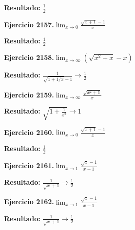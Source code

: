 \documentclass[10pt,a4paper]{article}
\begin{document}
\begin{solbox}
\textbf{Resultado:} \(\displaystyle \frac{1}{2}\)
\end{solbox}

\begin{ejbox}
\textbf{Ejercicio 2157.}\quad $\lim_{x\to 0} \frac{\sqrt{x+1}-1}{x}$
\end{ejbox}

\begin{solbox}
\textbf{Resultado:} \(\displaystyle \frac{1}{2}\)
\end{solbox}

\begin{ejbox}
\textbf{Ejercicio 2158.}\quad $\lim_{x\to \infty} (\sqrt{x^2+x} - x)$
\end{ejbox}

\begin{solbox}
\textbf{Resultado:} \(\displaystyle \frac{1}{\sqrt{1+1/x}+1} \to \frac{1}{2}\)
\end{solbox}

\newpage
\begin{ejbox}
\textbf{Ejercicio 2159.}\quad $\lim_{x\to \infty} \frac{\sqrt{x^2+1}}{x}$
\end{ejbox}

\begin{solbox}
\textbf{Resultado:} \(\displaystyle \sqrt{1+\frac{1}{x^2}} \to 1\)
\end{solbox}

\begin{ejbox}
\textbf{Ejercicio 2160.}\quad $\lim_{x\to 0} \frac{\sqrt{x+1}-1}{x}$
\end{ejbox}

\begin{solbox}
\textbf{Resultado:} \(\displaystyle \frac{1}{2}\)
\end{solbox}

\begin{ejbox}
\textbf{Ejercicio 2161.}\quad $\lim_{x\to 1} \frac{\sqrt{x}-1}{x-1}$
\end{ejbox}

\begin{solbox}
\textbf{Resultado:} \(\displaystyle \frac{1}{\sqrt{x}+1} \to \frac{1}{2}\)
\end{solbox}

\newpage
\begin{ejbox}
\textbf{Ejercicio 2162.}\quad $\lim_{x\to 1} \frac{\sqrt{x}-1}{x-1}$
\end{ejbox}

\begin{solbox}
\textbf{Resultado:} \(\displaystyle \frac{1}{\sqrt{x}+1} \to \frac{1}{2}\)
\end{solbox}
\end{document}
